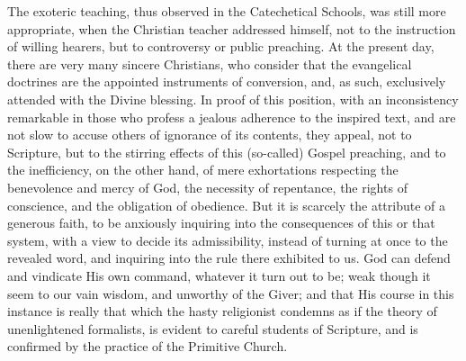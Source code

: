 The exoteric teaching, thus observed in the Catechetical Schools,
was still more appropriate, when the Christian teacher addressed
himself, not to the instruction of willing hearers, but to controversy
or public preaching. At the present day, there are very many sincere
Christians, who consider that the evangelical doctrines are the
appointed instruments of conversion, and, as such, exclusively
attended with the Divine blessing. In proof of this position, with an
inconsistency remarkable in those who profess a jealous adherence to
the inspired text, and are not slow to accuse others of ignorance of
its contents, they appeal, not to Scripture, but to the stirring
effects of this (so-called) Gospel preaching, and to the inefficiency,
on the other hand, of mere exhortations respecting the benevolence and
mercy of God, the necessity of repentance, the rights of conscience,
and the obligation of obedience. But it is scarcely the attribute of a
generous faith, to be anxiously inquiring into the consequences of
this or that system, with a view to decide its admissibility, instead
of turning at once to the revealed word, and inquiring into the rule
there exhibited to us. God can defend and vindicate His own command,
whatever it turn out to be; weak though it seem to our vain wisdom,
and unworthy of the Giver; and that His course in this instance is
really that which the hasty religionist condemns as if the theory of
unenlightened formalists, is evident to careful students of Scripture,
and is confirmed by the practice of the Primitive Church.

